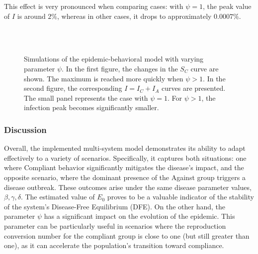 This effect is very pronounced when comparing cases: with $\psi = 1$, the peak value of $I$ is around $2\%$, whereas in other cases, it drops to approximately $0.0007\%$.
\begin{figure}[ht]
	\centering
	 \\
	 \\
	\caption[Simulation varying $\psi$]{Simulations of the epidemic-behavioral model with varying parameter $\psi$. In the first figure, the changes in the $S_C$ curve are shown. The maximum is reached more quickly when $\psi > 1$. In the second figure, the corresponding $I = I_C + I_A$ curves are presented. The small panel represents the case with $\psi = 1$. For $\psi > 1$, the infection peak becomes significantly smaller.}
	\label{fig:sim_psi}
\end{figure}


\subsubsection{Discussion}
Overall, the implemented multi-system model demonstrates its ability to adapt effectively to a variety of scenarios. Specifically, it captures both situations: one where Compliant behavior significantly mitigates the disease's impact, and the opposite scenario, where the dominant presence of the Against group triggers a disease outbreak. These outcomes arise under the same disease parameter values, $\beta, \gamma, \delta$. The estimated value of $E_0$ proves to be a valuable indicator of the stability of the system's Disease-Free Equilibrium (DFE). On the other hand, the parameter $\psi$ has a significant impact on the evolution of the epidemic. This parameter can be particularly useful in scenarios where the reproduction conversion number for the compliant group is close to one (but still greater than one), as it can accelerate the population's transition toward compliance.
